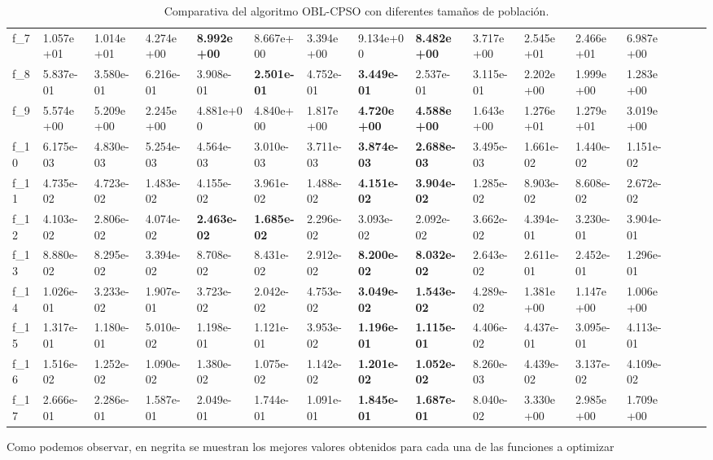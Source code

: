 \begin{table}[!ht]
{\begin{tabular}{LLLLLLLLLLLLLLLL}
f_{7} & 1.057e+01 & 1.014e+01 & 4.274e+00 & {\bf 8.992e+00} & 8.667e+00 & 3.394e+00 & 9.134e+00 & {\bf 8.482e+00} & 3.717e+00 & 2.545e+01 & 2.466e+01 & 6.987e+00 \\
f_{8} & 5.837e-01 & 3.580e-01 & 6.216e-01 & 3.908e-01 & {\bf 2.501e-01} & 4.752e-01 & {\bf 3.449e-01} & 2.537e-01 & 3.115e-01 & 2.202e+00 & 1.999e+00 & 1.283e+00 \\
f_{9} & 5.574e+00 & 5.209e+00 & 2.245e+00 & 4.881e+00 & 4.840e+00 & 1.817e+00 & {\bf 4.720e+00} & {\bf 4.588e+00} & 1.643e+00 & 1.276e+01 & 1.279e+01 & 3.019e+00 \\
f_{10} & 6.175e-03 & 4.830e-03 & 5.254e-03 & 4.564e-03 & 3.010e-03 & 3.711e-03 & {\bf 3.874e-03} & {\bf 2.688e-03} & 3.495e-03 & 1.661e-02 & 1.440e-02 & 1.151e-02 \\
f_{11} & 4.735e-02 & 4.723e-02 & 1.483e-02 & 4.155e-02 & 3.961e-02 & 1.488e-02 & {\bf 4.151e-02} & {\bf 3.904e-02} & 1.285e-02 & 8.903e-02 & 8.608e-02 & 2.672e-02 \\
f_{12} & 4.103e-02 & 2.806e-02 & 4.074e-02 & {\bf 2.463e-02} & {\bf 1.685e-02} & 2.296e-02 & 3.093e-02 & 2.092e-02 & 3.662e-02 & 4.394e-01 & 3.230e-01 & 3.904e-01 \\
f_{13} & 8.880e-02 & 8.295e-02 & 3.394e-02 & 8.708e-02 & 8.431e-02 & 2.912e-02 & {\bf 8.200e-02} & {\bf 8.032e-02} & 2.643e-02 & 2.611e-01 & 2.452e-01 & 1.296e-01 \\
f_{14} & 1.026e-01 & 3.233e-02 & 1.907e-01 & 3.723e-02 & 2.042e-02 & 4.753e-02 & {\bf 3.049e-02} & {\bf 1.543e-02} & 4.289e-02 & 1.381e+00 & 1.147e+00 & 1.006e+00 \\
f_{15} & 1.317e-01 & 1.180e-01 & 5.010e-02 & 1.198e-01 & 1.121e-01 & 3.953e-02 & {\bf 1.196e-01} & {\bf 1.115e-01} & 4.406e-02 & 4.437e-01 & 3.095e-01 & 4.113e-01 \\
f_{16} & 1.516e-02 & 1.252e-02 & 1.090e-02 & 1.380e-02 & 1.075e-02 & 1.142e-02 & {\bf 1.201e-02} & {\bf 1.052e-02} & 8.260e-03 & 4.439e-02 & 3.137e-02 & 4.109e-02 \\
f_{17} & 2.666e-01 & 2.286e-01 & 1.587e-01 & 2.049e-01 & 1.744e-01 & 1.091e-01 & {\bf 1.845e-01} & {\bf 1.687e-01} & 8.040e-02 & 3.330e+00 & 2.985e+00 & 1.709e+00 \\
    \bottomrule
    \end{tabular}}
    \captionsetup{justification=centering}
    \caption{Comparativa del algoritmo OBL-CPSO con diferentes tamaños de población.}    
\end{table}

Como podemos observar, en negrita se muestran los mejores valores obtenidos para cada una de las funciones a optimizar 

